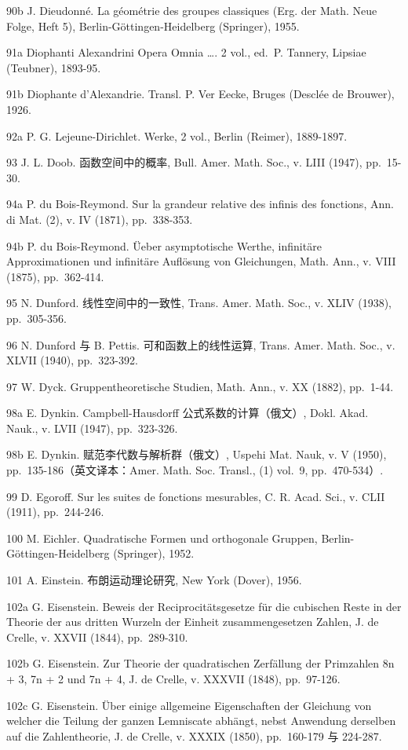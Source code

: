 90b J. Dieudonné. La géométrie des groupes classiques (Erg. der Math. Neue Folge, Heft 5), Berlin-Göttingen-Heidelberg (Springer), 1955.

91a Diophanti Alexandrini Opera Omnia \ldots. 2 vol., ed.~P. Tannery, Lipsiae (Teubner), 1893-95.

91b Diophante d'Alexandrie. Transl. P. Ver Eecke, Bruges (Desclée de Brouwer), 1926.

92a P. G. Lejeune-Dirichlet. Werke, 2 vol., Berlin (Reimer), 1889-1897.

93 J. L. Doob. 函数空间中的概率, Bull. Amer. Math. Soc., v. LIII (1947), pp.~15-30.

94a P. du Bois-Reymond. Sur la grandeur relative des infinis des fonctions, Ann. di Mat. (2), v. IV (1871), pp.~338-353.

94b P. du Bois-Reymond. Üeber asymptotische Werthe, infinitäre Approximationen und infinitäre Auflösung von Gleichungen, Math. Ann., v. VIII (1875), pp.~362-414.

95 N. Dunford. 线性空间中的一致性, Trans. Amer. Math. Soc., v. XLIV (1938), pp.~305-356.

96 N. Dunford 与 B. Pettis. 可和函数上的线性运算, Trans. Amer. Math. Soc., v. XLVII (1940), pp.~323-392.

97 W. Dyck. Gruppentheoretische Studien, Math. Ann., v. XX (1882), pp.~1-44.

98a E. Dynkin. Campbell-Hausdorff 公式系数的计算（俄文）, Dokl. Akad. Nauk., v. LVII (1947), pp.~323-326.

98b E. Dynkin. 赋范李代数与解析群（俄文）, Uspehi Mat. Nauk, v. V (1950), pp.~135-186（英文译本：Amer. Math. Soc. Transl., (1) vol.~9, pp.~470-534）.

99 D. Egoroff. Sur les suites de fonctions mesurables, C. R. Acad. Sci., v. CLII (1911), pp.~244-246.

100 M. Eichler. Quadratische Formen und orthogonale Gruppen, Berlin-Göttingen-Heidelberg (Springer), 1952.

101 A. Einstein. 布朗运动理论研究, New York (Dover), 1956.

102a G. Eisenstein. Beweis der Reciprocitätsgesetze für die cubischen Reste in der Theorie der aus dritten Wurzeln der Einheit zusammengesetzen Zahlen, J. de Crelle, v. XXVII (1844), pp.~289-310.

102b G. Eisenstein. Zur Theorie der quadratischen Zerfällung der Primzahlen 8n + 3, 7n + 2 und 7n + 4, J. de Crelle, v. XXXVII (1848), pp.~97-126.

102c G. Eisenstein. Über einige allgemeine Eigenschaften der Gleichung von welcher die Teilung der ganzen Lemniscate abhängt, nebst Anwendung derselben auf die Zahlentheorie, J. de Crelle, v. XXXIX (1850), pp.~160-179 与 224-287.

